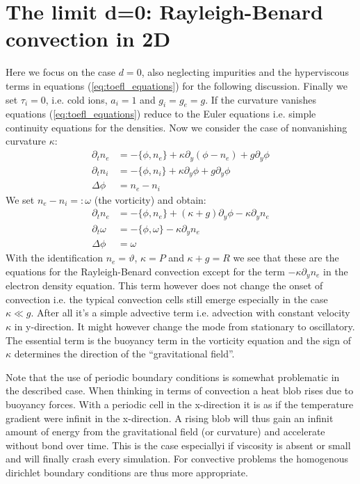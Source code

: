 \documentclass[a4paper,12pt]{scrartcl}
\begin{document}
\section{ The limit d=0: Rayleigh-Benard convection in 2D}
\label{sec:rayleigh-benard}
Here we focus on the case $d=0$, also neglecting impurities and the hyperviscous 
terms in equations (\ref{eq:toefl_equations}) for the following discussion. 
Finally we set $\tau_i=0$, i.e. cold ions, $a_i=1$ and $g_i=g_e=g$.
If the curvature vanishes equations (\ref{eq:toefl_equations}) reduce to the Euler 
equations i.e. simple continuity equations for the densities. 
Now we consider the case of nonvanishing curvature $\kappa$:
\begin{subequations}
\begin{align}
    \partial_t n_e &= -\{\phi,n_e\} +\kappa\partial_y(\phi - n_e)  + g\partial_y\phi \\
    \partial_t n_i &= -\{\phi,n_i\} +\kappa\partial_y\phi  + g\partial_y\phi \\
    \Delta\phi &= n_e - n_i
\end{align}
\label{eq:toefl_pre_rb}
\end{subequations}
We set $n_e - n_i =: \omega$ (the vorticity) and obtain:
\begin{subequations}
\begin{align}
    \partial_t n_e &= -\{\phi,n_e\} +(\kappa+g)\partial_y\phi - \kappa\partial_y n_e \\
    \partial_t \omega &=-\{\phi, \omega\} -\kappa \partial_y n_e \\
    \Delta\phi &= \omega 
\end{align}
\label{eq:toefl_rb}
\end{subequations}
With the identification $n_e = \vartheta$, $\kappa = P$ and $\kappa+g=R$ we see that these are
the equations for the Rayleigh-Benard convection except for the term 
$-\kappa\partial_y n_e$
in the electron density equation.
This term however does not change the onset of convection i.e. the 
typical convection cells still emerge especially in the case $\kappa \ll g$. 
After all it's a simple advective term 
i.e. advection with constant velocity $\kappa$ in y-direction. It might
however change the mode from stationary to oscillatory. 
The essential term is the buoyancy term in the vorticity equation and the
sign of $\kappa$ determines the direction of the ``gravitational field''. 

Note that the use of periodic boundary conditions is somewhat problematic in 
the described case. When thinking in terms of convection a heat blob rises due to
buoyancy forces. With a periodic cell in the x-direction it is as if the 
temperature gradient were infinit in the x-direction. A rising blob will thus
gain an infinit amount of energy from the gravitational field (or curvature)
and accelerate without bond over time. 
This is the case especiallyi if viscosity is absent or small and will finally 
crash every simulation.
For convective problems the homogenous dirichlet boundary conditions are thus more 
appropriate.







\end{document}
